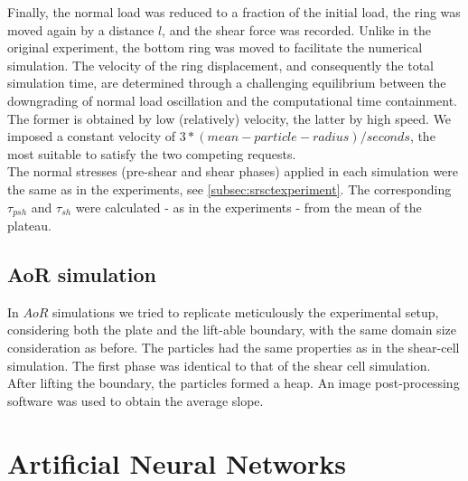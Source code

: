 \documentclass[review]{elsarticle}
\begin{document}
\begin{appendix}
Finally, the normal load was reduced to a fraction of the initial load, 
the ring was moved again by a distance $l$, and the shear force was recorded. 
Unlike in the original experiment, the bottom ring was moved to facilitate the numerical simulation. 
The velocity of the ring displacement, and consequently the total simulation time, are determined 
through a challenging equilibrium between the downgrading of normal load oscillation and the computational time containment. 
The former is obtained by low (relatively) velocity, the latter by high speed. We imposed a constant velocity 
of $3*(mean-particle-radius)/seconds$, the most suitable to satisfy the two competing requests. \\
The normal stresses (pre-shear and shear phases) applied in each simulation were
the same as in the experiments, see \ref{subsec:srsctexperiment}.
The corresponding $\tau_{psh}$ and $\tau_{sh}$ were calculated - as in the experiments - from the mean of the plateau.\\

\subsection{AoR simulation}
\label{subsec:aorsimulation}
In $AoR$ simulations we tried to replicate meticulously the experimental setup, 
considering both the plate and the lift-able boundary, with the same domain size consideration as before. 
The particles had the same properties as in the shear-cell simulation. The first phase was identical to that of the shear cell simulation. 
After lifting the boundary, the particles formed a heap.
An image post-processing software was used to obtain the average slope.


\section{Artificial Neural Networks}
\label{sec:appann}


\end{appendix}
\end{document}
